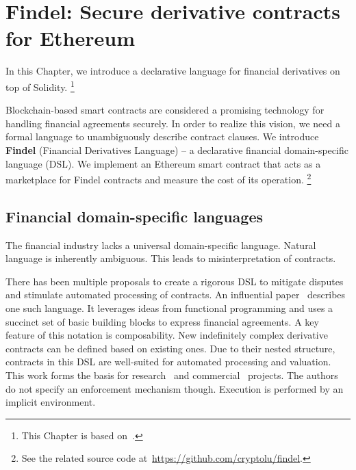 \chapter{Findel: Secure derivative contracts for Ethereum}

\label{Chapter10Findel}

In this Chapter, we introduce a declarative language for financial derivatives on top of Solidity.
\footnote{This Chapter is based on~\cite{Biryukov2017}.}

Blockchain-based smart contracts are considered a promising technology for handling financial agreements securely.
In order to realize this vision, we need a formal language to unambiguously describe contract clauses.
We introduce \textbf{Findel} (Financial Derivatives Language) -- a declarative financial domain-specific language (DSL).
We implement an Ethereum smart contract that acts as a marketplace for Findel contracts and measure the cost of its operation.
\footnote{See the related source code at~\url{https://github.com/cryptolu/findel}.}


\section{Financial domain-specific languages}

The financial industry lacks a universal domain-specific language.
Natural language is  inherently ambiguous.
This leads to misinterpretation of contracts.

There has been multiple proposals to create a rigorous DSL to mitigate disputes and stimulate automated processing of contracts.
An influential paper~\cite{PeytonJones2000} describes one such language.
It leverages ideas from functional programming and uses a succinct set of basic building blocks to express financial agreements.
A key feature of this notation is composability.
New indefinitely complex derivative contracts can be defined based on existing ones.
Due to their nested structure, contracts in this DSL are well-suited for automated processing and valuation.
This work forms the basis for research~\cite{Gaillourdet2011, Schuldenzucker2014} and commercial~\cite{Frankau2009} projects.
The authors do not specify an enforcement mechanism though.
Execution is performed by an implicit environment.


